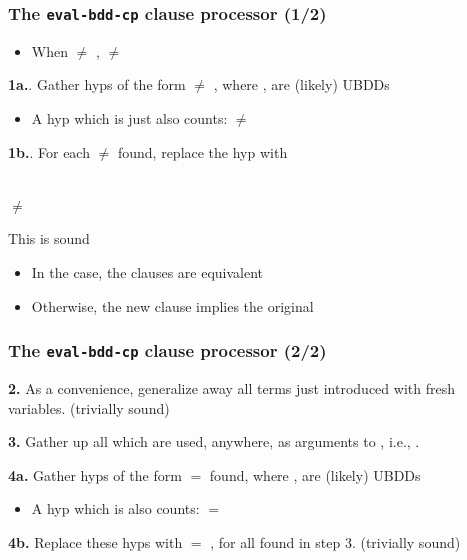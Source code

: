 \begin{frame}[fragile]
\frametitle{The {\tt eval-bdd-cp} clause processor (1/2)}

\begin{itemize}
\item When  $\neq$ ,
        $\neq$ 
\end{itemize}

\SmallSkip
{\bf 1a.}.  Gather hyps of the form  $\neq$ , where
,  are (likely) UBDDs
\begin{itemize}
\item A hyp which is just  also counts:  $\neq$ 
\end{itemize}

\SmallSkip
{\bf 1b.}.  For each  $\neq$  found, replace the hyp with
\begin{center}
 \\
\qquad {} $\neq$ 
\end{center}

This is sound
\begin{itemize}
\item In the  case, the clauses are equivalent
\item Otherwise, the new clause implies the original
\end{itemize}

\end{frame}


\begin{frame}[fragile]
\frametitle{The {\tt eval-bdd-cp} clause processor (2/2)}

{\bf 2.} As a convenience, generalize away all  terms just
introduced with fresh variables. (trivially sound)

\SmallSkip
{\bf 3.} Gather up all  which are used, anywhere, as arguments to
, i.e., .

\SmallSkip
{\bf 4a.} Gather hyps of the form  $=$  found, where ,
 are (likely) UBDDs
\begin{itemize}
\item A hyp which is  also counts:  $=$ 
\end{itemize}

\SmallSkip
{\bf 4b.} Replace these hyps with  $=$ , 
for all  found in step 3. (trivially sound)

\end{frame}



